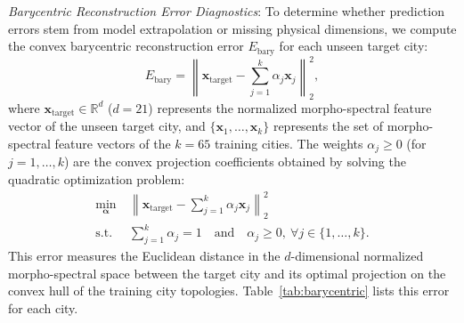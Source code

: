 \documentclass[lettersize,journal]{IEEEtran}
\begin{document}
\textit{Barycentric Reconstruction Error Diagnostics}: To determine whether prediction errors stem from model extrapolation or missing physical dimensions, we compute the convex barycentric reconstruction error $E_{\text{bary}}$ for each unseen target city:
\begin{equation}
E_{\text{bary}} = \left\| \mathbf{x}_{\text{target}} - \sum_{j=1}^k \alpha_j \mathbf{x}_j \right\|_2^2,
\end{equation}
where $\mathbf{x}_{\text{target}} \in \mathbb{R}^{d}$ ($d=21$) represents the normalized morpho-spectral feature vector of the unseen target city, and $\{\mathbf{x}_1, \dots, \mathbf{x}_k\}$ represents the set of morpho-spectral feature vectors of the $k=65$ training cities. The weights $\alpha_j \ge 0$ (for $j = 1, \dots, k$) are the convex projection coefficients obtained by solving the quadratic optimization problem:
\begin{align}
\min_{\boldsymbol{\alpha}} \ & \left\| \mathbf{x}_{\text{target}} - \sum_{j=1}^k \alpha_j \mathbf{x}_j \right\|_2^2 \\
\text{s.t.} \ & \sum_{j=1}^k \alpha_j = 1 \quad \text{and} \quad \alpha_j \ge 0, \ \forall j \in \{1, \dots, k\}.
\end{align}
This error measures the Euclidean distance in the $d$-dimensional normalized morpho-spectral space between the target city and its optimal projection on the convex hull of the training city topologies. Table~\ref{tab:barycentric} lists this error for each city.

\begin{table}[htbp]
\caption{Barycentric Reconstruction Error vs. Max Relative Emission Error}
\label{tab:barycentric}
\centering
{}
\end{table}
\end{document}
